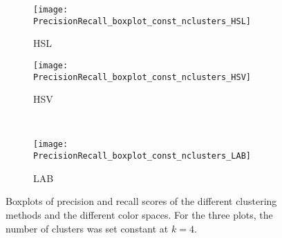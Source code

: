 \begin{figure}[!ht]
    \centering
    \begin{subfigure}[b]{0.49\textwidth}
        \texttt{[image: PrecisionRecall\_boxplot\_const\_nclusters\_HSL]}
        \caption{HSL}
    \end{subfigure}
    \begin{subfigure}[b]{0.49\textwidth}
    	\centering
    	\texttt{[image: PrecisionRecall\_boxplot\_const\_nclusters\_HSV]}
        \caption{HSV}
    \end{subfigure}\\     
    \begin{subfigure}[b]{0.49\textwidth}
    	\centering
        \texttt{[image: PrecisionRecall\_boxplot\_const\_nclusters\_LAB]}
        \caption{LAB}
    \end{subfigure} 
        	    
    \caption{Boxplots of precision and recall scores of the different clustering methods and the different color spaces. For the three plots, the number of clusters was set constant at $k=4$.}\label{fig:PR_boxplot_scores}    
\end{figure}



